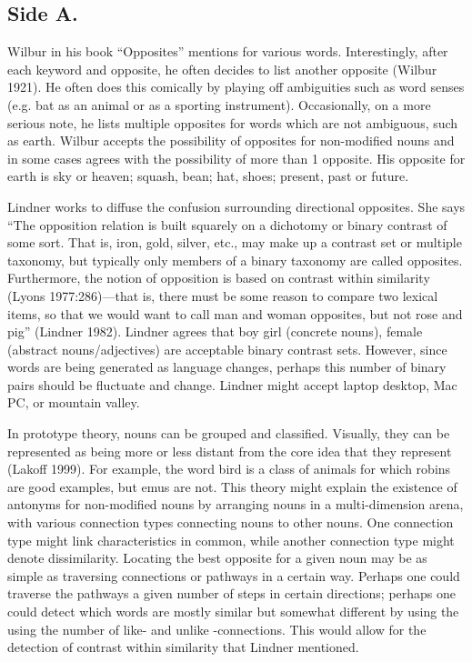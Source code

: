 

\subsection {Side A.} Wilbur in his book “Opposites” mentions for various words.  Interestingly, after each keyword and opposite, he often decides to list another opposite (Wilbur 1921).  He often does this comically by playing off ambiguities such as word senses (e.g. bat as an animal or as a sporting instrument).  Occasionally, on a more serious note, he lists multiple opposites for words which are not ambiguous, such as earth.  Wilbur accepts the possibility of opposites for non-modified nouns and in some cases agrees with the possibility of more than 1 opposite.  His opposite for earth is sky or heaven; squash, bean; hat, shoes; present, past or future.

Lindner works to diffuse the confusion surrounding directional opposites.  She says “The opposition relation is built squarely on a dichotomy or binary contrast of some sort.  That is, iron, gold, silver, etc., may make up a contrast set or multiple taxonomy, but typically only members of a binary taxonomy are called opposites.  Furthermore, the notion of opposition is based on contrast within similarity (Lyons 1977:286)—that is, there must be some reason to compare two lexical items, so that we would want to call man and woman opposites, but not rose and pig” (Lindner 1982). Lindner agrees that boy \opp girl (concrete nouns), female \oppmale (abstract nouns/adjectives) are acceptable binary contrast sets.  However, since words are being generated as language changes, perhaps this number of binary pairs should be fluctuate and change.  Lindner might accept laptop \opp desktop, Mac \opp PC, or mountain \opp valley. 

In prototype theory, nouns can be grouped and classified.  Visually, they can be represented as being more or less distant from the core idea that they represent (Lakoff 1999).  For example, the word bird is a class of animals for which robins are good examples, but emus are not.  This theory might explain the existence of antonyms for non-modified nouns by arranging nouns in a multi-dimension arena, with various connection types connecting nouns to other nouns.  One connection type might link characteristics in common, while another connection type might denote dissimilarity.  Locating the best opposite for a given noun may be as simple as traversing connections or pathways in a certain way.  Perhaps one could traverse the pathways a given number of steps in certain directions; perhaps one could detect which words are mostly similar but somewhat different by using the using the number of like- and unlike -connections.  This would allow for the detection of contrast within similarity that Lindner mentioned.  

